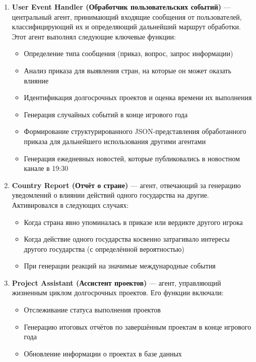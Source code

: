 \begin{enumerate}
    \item \textbf{User Event Handler (Обработчик пользовательских событий)} — центральный агент, принимающий входящие сообщения от пользователей, классифицирующий их и определяющий дальнейший маршрут обработки. Этот агент выполнял следующие ключевые функции:
    \begin{itemize}
        \item Определение типа сообщения (приказ, вопрос, запрос информации)
        \item Анализ приказа для выявления стран, на которые он может оказать влияние
        \item Идентификация долгосрочных проектов и оценка времени их выполнения
        \item Генерация случайных событий в конце игрового года
        \item Формирование структурированного JSON-представления обработанного приказа для дальнейшего использования другими агентами
        \item Генерация ежедневных новостей, которые публиковались в новостном канале в 19:30
    \end{itemize}

    \item \textbf{Country Report (Отчёт о стране)} — агент, отвечающий за генерацию уведомлений о влиянии действий одного государства на другие. Активировался в следующих случаях:
    \begin{itemize}
        \item Когда страна явно упоминалась в приказе или вердикте другого игрока
        \item Когда действие одного государства косвенно затрагивало интересы другого государства (с определённой вероятностью)
        \item При генерации реакций на значимые международные события
    \end{itemize}

    \item \textbf{Project Assistant (Ассистент проектов)} — агент, управляющий жизненным циклом долгосрочных проектов. Его функции включали:
    \begin{itemize}
        \item Отслеживание статуса выполнения проектов
        \item Генерацию итоговых отчётов по завершённым проектам в конце игрового года
        \item Обновление информации о проектах в базе данных
    \end{itemize}


\end{enumerate}
